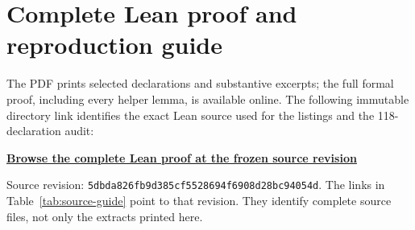 \documentclass[11pt]{article}
\theoremstyle{definition}
\theoremstyle{remark}
\begin{document}
\appendix
\section{Complete Lean proof and reproduction guide}\label{app:lean-source}

The PDF prints selected declarations and substantive excerpts; the full
formal proof, including every helper lemma, is available online. The
following immutable directory link identifies the exact Lean source used
for the listings and the 118-declaration audit:
\begin{center}
\href{https://github.com/alectionary/vibe-math/tree/5dbda826fb9d385cf5528694f6908d28bc94054d/formalization/dyadic-rank}{\textbf{Browse the complete Lean proof at the frozen source revision}}
\end{center}
\noindent Source revision:
\nolinkurl{5dbda826fb9d385cf5528694f6908d28bc94054d}.
The links in Table~\ref{tab:source-guide} point to that revision. They
identify complete source files, not only the extracts printed here.
\end{document}
